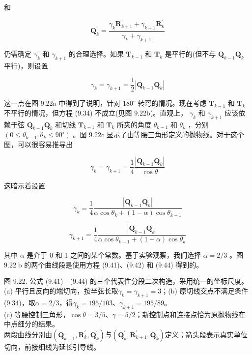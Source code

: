\documentclass[../main.tex]{subfiles}
\begin{document}
和

\[
{\mathbf{Q}}_{k}^{\prime } = \frac{{\gamma }_{k}{\mathbf{R}}_{k + 1}^{\prime } + {\gamma }_{k + 1}{\mathbf{R}}_{k}^{\prime }}{{\gamma }_{k} + {\gamma }_{k + 1}} \tag{9.42}
\]

仍需确定 \({\gamma }_{k}\) 和 \({\gamma }_{k + 1}\) 的合理选择。如果 \({\mathbf{T}}_{k - 1}\) 和 \({\mathbf{T}}_{k}\) 是平行的(但不与 \({\mathbf{Q}}_{k - 1}{\mathbf{Q}}_{k}\) 平行)，则设置

\[
{\gamma }_{k} = {\gamma }_{k + 1} = \frac{1}{2}\left| {{\mathbf{Q}}_{k - 1}{\mathbf{Q}}_{k}}\right|  \tag{9.43}
\]

这一点在图 9.22a 中得到了说明，针对 \({180}^{ \circ  }\) 转弯的情况。现在考虑 \({\mathbf{T}}_{k - 1}\) 和 \({\mathbf{T}}_{k}\) 不平行的情况，但方程 (9.34) 不成立(见图 9.22b)。直观上， \({\gamma }_{k}\) 和 \({\gamma }_{k + 1}\) 应该依赖于弦 \({\mathbf{Q}}_{k - 1}{\mathbf{Q}}_{k}\) 和切线 \({\mathbf{T}}_{k - 1}\) 和 \({\mathbf{T}}_{k}\) 所夹的角度 \({\theta }_{k - 1}\) 和 \({\theta }_{k}\) ，分别 \(\left( {0 \leq  {\theta }_{k - 1},{\theta }_{k} \leq  {90}^{ \circ  }}\right)\) 。图 \({9.22}\mathrm{c}\) 显示了由等腰三角形定义的抛物线。对于这个图，可以很容易推导出

\[
{\gamma }_{k} = {\gamma }_{k + 1} = \frac{1}{4}\frac{\left| {\mathbf{Q}}_{k - 1}{\mathbf{Q}}_{k}\right| }{\cos \theta }
\]

这暗示着设置

\[
{\gamma }_{k} = \frac{1}{4}\frac{\left| {\mathbf{Q}}_{k - 1}{\mathbf{Q}}_{k}\right| }{\alpha \cos {\theta }_{k} + \left( {1 - \alpha }\right) \cos {\theta }_{k - 1}}
\]



\[
{\gamma }_{k + 1} = \frac{1}{4}\frac{\left| {\mathbf{Q}}_{k - 1}{\mathbf{Q}}_{k}\right| }{\alpha \cos {\theta }_{k - 1} + \left( {1 - \alpha }\right) \cos {\theta }_{k}} \tag{9.44}
\]

其中 \(\alpha\) 是介于 0 和 1 之间的某个常数。基于实验观察，我们选择 \(\alpha  = 2/3\) 。图 \({9.22}\mathrm{\;b}\) 的两个曲线段是使用方程 (9.41)、(9.42) 和 (9.44) 得到的。

\begin{center}
\begin{minipage}{37cm}
\vspace*{.6\baselineskip}
\centering
{}
\par\smallskip
{}
\par\smallskip
图 9.22. 公式 (9.41)—(9.44) 的三个代表性分段二次构造，采用统一的坐标尺度。\\
(a) 平行且反向的端切向，按半弦长取$\gamma_k=\gamma_{k+1}=3$；(b) 原切线交点不满足条件 (9.34)，取$\alpha=2/3$，得$\gamma_k=195/103$、$\gamma_{k+1}=195/89$。\\
(c) 等腰控制三角形，$\cos\theta=3/5$、$\gamma=5/2$；新控制点和连接点恰为原抛物线在中点细分的结果。\\
两段曲线分别由$(\mathbf Q_{k-1},\mathbf R_k^{\prime},\mathbf Q_k^{\prime})$与$(\mathbf Q_k^{\prime},\mathbf R_{k+1}^{\prime},\mathbf Q_k)$定义；箭头段表示真实单位切向，前接细线为延长引导线。
\end{minipage}
\end{center}
\end{document}
